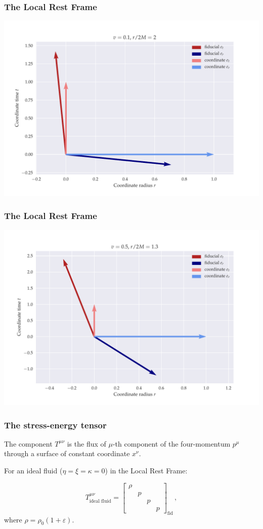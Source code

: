 \documentclass{beamer}
\begin{document}
\begin{frame}
    \frametitle{The Local Rest Frame}
        \includegraphics[width=\textwidth]{figures/low_speed}
\end{frame}

\begin{frame}
    \frametitle{The Local Rest Frame}
        \includegraphics[width=\textwidth]{figures/high_speed}
\end{frame}

\begin{frame}
    \frametitle{The stress-energy tensor}

    The component \(T^{\mu\nu}\) is the flux of \(\mu\)-th component of the four-momentum \(p^\mu\) through a surface of constant coordinate \(x^\nu\).

    For an ideal fluid (\(\eta = \xi = \kappa = 0\)) in the Local Rest Frame:

    \begin{equation*}
        T^{\mu\nu}_{\text{ideal fluid}} =
        \begin{bmatrix}
        \rho   &   &   &  \\
           & p  &   &  \\
           &   & p  &  \\
           &   &   & p
       \end{bmatrix}_{\text{fid}} \,,
    \end{equation*}
    where \(\rho = \rho_0 (1 + \varepsilon)\).
\end{frame}
\end{document}
